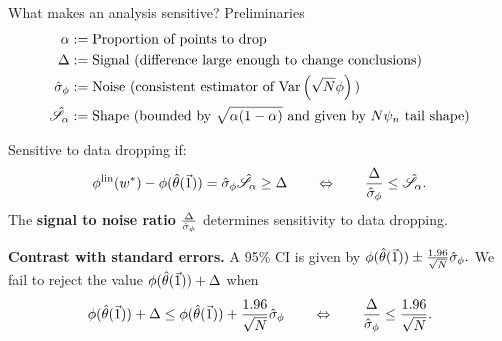 
\begin{frame}[t]{What makes an analysis sensitive?  Preliminaries}
%
\vspace{-2em}
\begin{align*}
%
\alpha :={}& \textrm{Proportion of points to drop}\\
\Delta :={}& \textrm{Signal (difference large enough to change conclusions)}\\
\noise :={}& \textrm{Noise (consistent estimator of }
    \var{}{\sqrt{N} \thetafun}\textrm{)}\\
\shape :={}& \textrm{Shape (bounded by }
    \sqrt{\alpha(1-\alpha)}\textrm{ and given by }
    N\infl_n\textrm{ tail shape)}
%
\end{align*}
%
\hrulefill

Sensitive to data dropping if:
%
\begin{align*}
%
\thetafunlin(\w^*) - \thetafun(\thetahat(\onevec))  =
    \noise \shape \ge \Delta
\quad\quad
\Leftrightarrow
\quad\quad
\frac{\Delta}{\noise} \le \shape.
%
\end{align*}
%
The \textbf{signal to noise ratio} $\frac{\Delta}{\hat\sigma_{\phi}}$
determines sensitivity to data dropping.

\hrulefill

\textbf{Contrast with standard errors.}  A 95\% CI is given by
%
%
$
\phi(\hat{\theta}(\vec{1})) \pm \frac{1.96}{\sqrt{N}} \hat\sigma_{\phi}.
$
%
%
We fail to reject the value
$\phi(\hat{\theta}(\vec{1})) + \Delta$ when
%
\begin{align*}
%
\thetafun(\thetahat(\onevec)) + \Delta \le
\thetafun(\thetahat(\onevec)) + \frac{1.96}{\sqrt{N}} \noise
\quad\quad
\Leftrightarrow
\quad\quad
\frac{\Delta}{\noise} \le \frac{1.96}{\sqrt{N}}.
%
\end{align*}
%
\end{frame}



